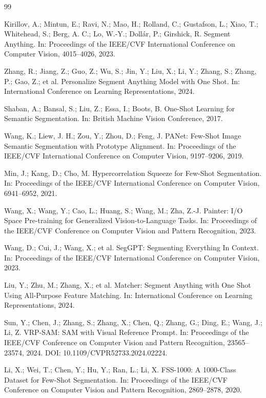 \documentclass{CVM}
\begin{document}
\begin{thebibliography}{99}

 Kirillov, A.; Mintun, E.; Ravi, N.; Mao, H.; Rolland, C.; Gustafson, L.; Xiao, T.; Whitehead, S.; Berg, A. C.; Lo, W.-Y.; Doll{\'a}r, P.; Girshick, R. Segment Anything. In: Proceedings of the IEEE/CVF International Conference on Computer Vision, 4015--4026, 2023.

 Zhang, R.; Jiang, Z.; Guo, Z.; Wu, S.; Jin, Y.; Liu, X.; Li, Y.; Zhang, S.; Zhang, P.; Gao, Z.; et al. Personalize Segment Anything Model with One Shot. In: International Conference on Learning Representations, 2024.

 Shaban, A.; Bansal, S.; Liu, Z.; Essa, I.; Boots, B. One-Shot Learning for Semantic Segmentation. In: British Machine Vision Conference, 2017.

 Wang, K.; Liew, J. H.; Zou, Y.; Zhou, D.; Feng, J. PANet: Few-Shot Image Semantic Segmentation with Prototype Alignment. In: Proceedings of the IEEE/CVF International Conference on Computer Vision, 9197--9206, 2019.

 Min, J.; Kang, D.; Cho, M. Hypercorrelation Squeeze for Few-Shot Segmentation. In: Proceedings of the IEEE/CVF International Conference on Computer Vision, 6941--6952, 2021.

 Wang, X.; Wang, Y.; Cao, L.; Huang, S.; Wang, M.; Zha, Z.-J. Painter: I/O Space Pre-training for Generalized Vision-to-Language Tasks. In: Proceedings of the IEEE/CVF Conference on Computer Vision and Pattern Recognition, 2023.

 Wang, D.; Cui, J.; Wang, X.; et al. SegGPT: Segmenting Everything In Context. In: Proceedings of the IEEE/CVF International Conference on Computer Vision, 2023.

 Liu, Y.; Zhu, M.; Zhang, X.; et al. Matcher: Segment Anything with One Shot Using All-Purpose Feature Matching. In: International Conference on Learning Representations, 2024.

 Sun, Y.; Chen, J.; Zhang, S.; Zhang, X.; Chen, Q.; Zhang, G.; Ding, E.; Wang, J.; Li, Z. VRP-SAM: SAM with Visual Reference Prompt. In: Proceedings of the IEEE/CVF Conference on Computer Vision and Pattern Recognition, 23565--23574, 2024. DOI: 10.1109/CVPR52733.2024.02224.

 Li, X.; Wei, T.; Chen, Y.; Hu, Y.; Ran, L.; Li, X. FSS-1000: A 1000-Class Dataset for Few-Shot Segmentation. In: Proceedings of the IEEE/CVF Conference on Computer Vision and Pattern Recognition, 2869--2878, 2020.


\end{thebibliography}
\end{document}
